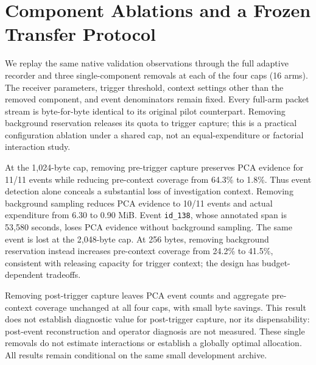 \section{Component Ablations and a Frozen Transfer Protocol}
\label{sec:ablations}
We replay the same native validation observations through the full adaptive
recorder and three single-component removals at each of the four caps (16 arms).
The receiver parameters, trigger threshold, context settings other than the removed
component, and event denominators remain fixed. Every full-arm packet stream is
byte-for-byte identical to its original pilot counterpart. Removing background
reservation releases its quota to trigger capture; this is a practical configuration
ablation under a shared cap, not an equal-expenditure or factorial interaction study.

\begin{table}[htbp]
\centering
\small

\caption{Paired development ablations. Pre-context is the macro fraction of original
observations retained in each eligible event's five-minute pre-onset window.
All variants share 11 eligible events; actual expenditure differs.}
\label{tab:ablations}
\end{table}

At the 1,024-byte cap, removing pre-trigger capture preserves PCA evidence for
11/11 events while reducing pre-context coverage from 64.3\% to 1.8\%.
Thus event detection alone conceals a substantial loss of investigation context.
Removing background sampling reduces PCA evidence to 10/11 events and actual
expenditure from 6.30 to 0.90 MiB. Event \texttt{id\_138}, whose annotated span is
53,580 seconds, loses PCA evidence without background sampling. The same event is
lost at the 2,048-byte cap. At 256 bytes, removing background reservation instead
increases pre-context coverage from 24.2\% to 41.5\%, consistent with releasing
capacity for trigger context; the design has budget-dependent tradeoffs.

Removing post-trigger capture leaves PCA event counts and aggregate pre-context
coverage unchanged at all four caps, with small byte savings. This result does not
establish diagnostic value for post-trigger capture, nor its dispensability:
post-event reconstruction and operator diagnosis are not measured. These single
removals do not estimate interactions or establish a globally optimal allocation.
All results remain conditional on the same small development archive.

